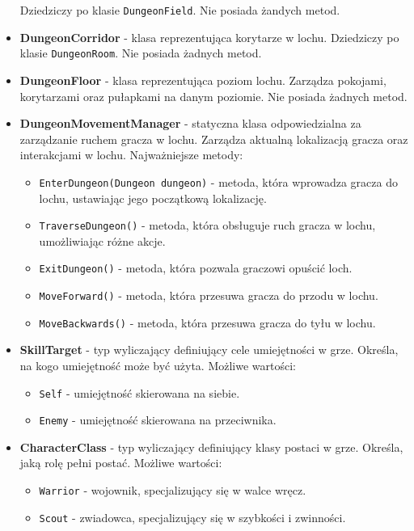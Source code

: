 \begin{itemize}
        Dziedziczy po klasie \texttt{DungeonField}. Nie posiada żandych metod.
        \item \textbf{DungeonCorridor} - klasa reprezentująca korytarze w lochu. 
        Dziedziczy po klasie \texttt{DungeonRoom}. Nie posiada żadnych metod.
        \item \textbf{DungeonFloor} - klasa reprezentująca poziom lochu. 
        Zarządza pokojami, korytarzami oraz pułapkami na danym poziomie. Nie posiada żadnych metod.
        \item \textbf{DungeonMovementManager} - statyczna klasa odpowiedzialna za zarządzanie ruchem gracza w lochu. 
        Zarządza aktualną lokalizacją gracza oraz interakcjami w lochu. Najważniejsze metody:
            \begin{itemize}
                \item \texttt{EnterDungeon(Dungeon dungeon)} - metoda, która wprowadza gracza do lochu, ustawiając jego początkową lokalizację.
                \item \texttt{TraverseDungeon()} - metoda, która obsługuje ruch gracza w lochu, umożliwiając różne akcje.
                \item \texttt{ExitDungeon()} - metoda, która pozwala graczowi opuścić loch.
                \item \texttt{MoveForward()} - metoda, która przesuwa gracza do przodu w lochu.
                \item \texttt{MoveBackwards()} - metoda, która przesuwa gracza do tyłu w lochu.
            \end{itemize}
        \item \textbf{SkillTarget} - typ wyliczający definiujący cele umiejętności w grze. 
        Określa, na kogo umiejętność może być użyta. Możliwe wartości:
            \begin{itemize}
                \item \texttt{Self} - umiejętność skierowana na siebie.
                \item \texttt{Enemy} - umiejętność skierowana na przeciwnika.
            \end{itemize}
        \item \textbf{CharacterClass} - typ wyliczający definiujący klasy postaci w grze. 
        Określa, jaką rolę pełni postać. Możliwe wartości:
            \begin{itemize}
                \item \texttt{Warrior} - wojownik, specjalizujący się w walce wręcz.
                \item \texttt{Scout} - zwiadowca, specjalizujący się w szybkości i zwinności.

\end{itemize}
\end{itemize}
